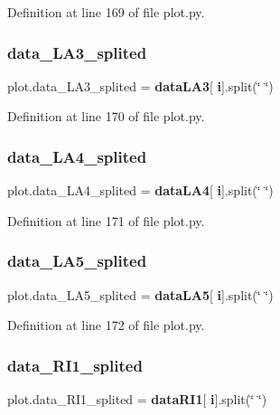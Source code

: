 Definition at line 169 of file plot.\+py.

\mbox{\label{namespaceplot_ae5a26c6297be663fbea8241cbeec6f1f}} 
\subsubsection{data\+\_\+\+L\+A3\+\_\+splited}
{\footnotesize\ttfamily plot.\+data\+\_\+\+L\+A3\+\_\+splited = \textbf{ data\+L\+A3}[\textbf{ i}].split(\char`\"{} \char`\"{})}



Definition at line 170 of file plot.\+py.

\mbox{\label{namespaceplot_a2d9769ffd3e67b76ba42ed18708ea310}} 
\subsubsection{data\+\_\+\+L\+A4\+\_\+splited}
{\footnotesize\ttfamily plot.\+data\+\_\+\+L\+A4\+\_\+splited = \textbf{ data\+L\+A4}[\textbf{ i}].split(\char`\"{} \char`\"{})}



Definition at line 171 of file plot.\+py.

\mbox{\label{namespaceplot_a155faeb3da7994e42cbdc6adcfc62395}} 
\subsubsection{data\+\_\+\+L\+A5\+\_\+splited}
{\footnotesize\ttfamily plot.\+data\+\_\+\+L\+A5\+\_\+splited = \textbf{ data\+L\+A5}[\textbf{ i}].split(\char`\"{} \char`\"{})}



Definition at line 172 of file plot.\+py.

\mbox{\label{namespaceplot_a977798bbd77944e2403499bf1eee85d4}} 
\subsubsection{data\+\_\+\+R\+I1\+\_\+splited}
{\footnotesize\ttfamily plot.\+data\+\_\+\+R\+I1\+\_\+splited = \textbf{ data\+R\+I1}[\textbf{ i}].split(\char`\"{} \char`\"{})}




